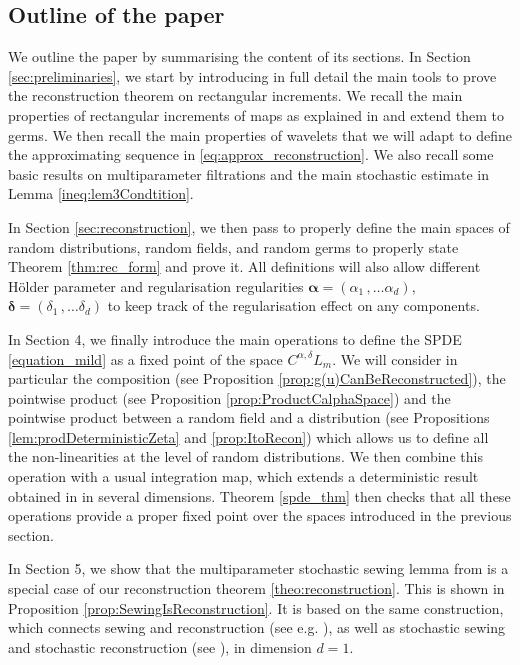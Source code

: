 \documentclass[12pt]{article}
\numberwithin{equation}{section}
\theoremstyle{plain}
\theoremstyle{definition}
\def\falpha{{\boldsymbol\alpha}}
\def\fdelta{{\boldsymbol\delta}}
\begin{document}
\subsection{Outline of the paper}

We  outline the paper by summarising the content of its sections. In Section \ref{sec:preliminaries}, 
we start by introducing in full detail the main tools to prove the reconstruction theorem on rectangular increments. We
recall the main properties of rectangular increments of maps as explained in \cite{harang21} and extend them to germs. We then recall the main properties of wavelets  \cite{debauchies} that we will adapt to define the approximating sequence in \eqref{eq:approx_reconstruction}. We also recall some basic results on multiparameter filtrations and the main stochastic estimate in Lemma \eqref{ineq:lem3Condtition}.

In Section \ref{sec:reconstruction}, we then pass to properly define the main spaces of random distributions, random fields, and random germs to  
properly state Theorem \ref{thm:rec_form} and prove it. All definitions will also allow different H\"older parameter and regularisation regularities $\falpha=(\alpha_1\,, \ldots \alpha_d)$, $\fdelta=(\delta_1\,,\ldots \delta_d)$ to keep track of the regularisation effect on any components.

In Section 4, we finally introduce the main operations to define the SPDE \eqref{equation_mild} as a fixed point of the space $C^{\alpha, \delta}L_m$. We will consider in particular the composition (see Proposition \ref{prop:g(u)CanBeReconstructed}),  the pointwise product  (see Proposition \ref{prop:ProductCalphaSpace})  and the pointwise product between a random field and a distribution (see Propositions \ref{lem:prodDeterministicZeta} and \ref{prop:ItoRecon}) which allows us to define all the non-linearities at the level of random distributions. We then combine this operation with  a usual integration map, which extends a deterministic result obtained in \cite{Brault2019} in several dimensions. Theorem \ref{spde_thm} then checks that all these operations provide a proper fixed point over the spaces introduced in the previous section. 

In Section 5, we show that the multiparameter stochastic sewing lemma from \cite{multiparameterStochSewing} is a special case of our reconstruction theorem \ref{theo:reconstruction}. This is shown in Proposition \ref{prop:SewingIsReconstruction}. It is based on the same construction, which connects sewing and reconstruction (see e.g. \cite{Broux2022}), as well as stochastic sewing and stochastic reconstruction (see \cite{kern2021}), in dimension $d=1$.
\end{document}
